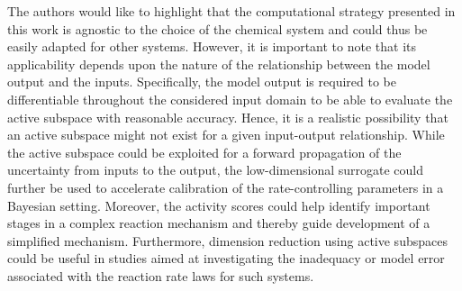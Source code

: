  The authors would like to highlight that the computational strategy presented in this work is agnostic to the choice
 of the chemical system and could thus be easily adapted for other systems. However, it is important to note that
 its applicability depends upon the nature of the relationship between the model output and the inputs. Specifically,
 the model output is required to be differentiable throughout the considered input domain to be able to evaluate
 the active subspace with reasonable accuracy. Hence, it is a realistic possibility that an active subspace might not
 exist for a given input-output relationship. While the active subspace could be exploited for a forward propagation of
 the uncertainty from inputs to the output, the low-dimensional surrogate could further be used to accelerate 
 calibration of the rate-controlling parameters in a Bayesian setting. Moreover, the activity scores could help
 identify important stages in a complex reaction mechanism and thereby guide development of a simplified
 mechanism. Furthermore, dimension reduction using active subspaces could be useful in studies aimed at
 investigating the inadequacy or model error associated with the reaction rate laws for such systems.  
 
 
 
 
 
 
 
